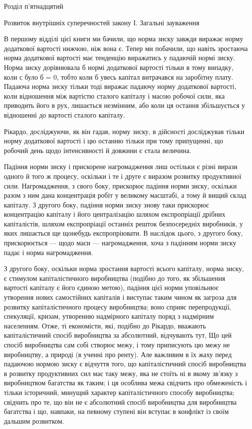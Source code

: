 
Розділ п’ятнадцятий

Розвиток внутрішніх суперечностей закону
І. Загальні зауваження

В першому відділі цієї книги ми бачили, що норма зиску завжди виражає норму додаткової вартості
нижчою, ніж вона є. Тепер ми побачили, що навіть зростаюча норма додаткової вартості має тенденцію
виражатись у падаючій нормі зиску. Норма
зиску дорівнювала б нормі додаткової вартості тільки в тому випадку, коли с було б = 0, тобто коли б
увесь капітал витрачався на заробітну плату. Падаюча норма зиску тільки тоді виражає падаючу норму
додаткової вартості, коли відношення між вартістю сталого капіталу і масою робочої сили, яка
приводить його в рух, лишається незмінним, або коли ця остання збільшується у відношенні до вартості
сталого капіталу.

Рікардо, досліджуючи, як він гадав, норму зиску, в дійсності досліджував тільки норму додаткової
вартості і цю останню тільки при тому припущенні, що робочий день щодо інтенсивності й довжини є
стала величина.

Падіння норми зиску і прискорене нагромадження лиш остільки є різні вирази одного й того ж процесу,
оскільки і те і друге є виразом розвитку продуктивної сили. Нагромадження, з свого боку, прискорює
падіння норми зиску, оскільки разом з ним
дана концентрація робіт у великому масштабі, а тому й вищий склад капіталу. З другого боку, падіння
норми зиску знову таки прискорює концентрацію капіталу і його централізацію шляхом експропріації
дрібних капіталістів, шляхом експропріації
останніх решток безпосередніх виробників, у яких лишається ще щонебудь експропріювати. В наслідок
цього, з другого боку, прискорюється — щодо маси — нагромадження, хоча з падінням норми зиску падає
і норма нагромадження.

З другого боку, оскільки норма зростання вартості всього капіталу, норма зиску, є стимулом
капіталістичного виробництва (подібно до того, як збільшення вартості капіталу є його єдиною метою),
падіння цієї норми уповільнює утворення нових самостійних капіталів і виступає таким чином як
загроза для розвитку капіталістичного процесу виробництва; воно сприяє перепродукції, спекуляції,
кризам, утворенню надмірного капіталу поряд з надмірним населенням. Отже, ті економісти, які,
подібно до Рікардо, вважають капіталістичний спосіб виробництва за абсолютний, відчувають тут, Що
цей спосіб виробництва сам собі створює межу, і тому приписують цю межу не виробництву, а природі (в
ученні про ренту). Але важливим в їх жаху перед падаючою нормою зиску є відчуття того, що
капіталістичний спосіб виробництва в розвитку продуктивних сил має таку межу, яка не стоїть ні в
якому зв’язку з виробництвом багатства як таким;
і ця особлива межа свідчить про обмеженість і тільки
історичний, минущий характер капіталістичного способу виробництва;
свідчить про те, що він не є абсолютний спосіб виробництва
для виробництва багатства і що, навпаки, на певному
ступені він вступає в конфлікт із своїм дальшим розвитком.

